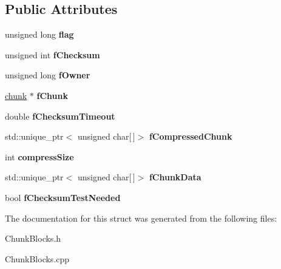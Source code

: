 \subsection*{\-Public \-Attributes}
\begin{DoxyCompactItemize}
\item 
\hypertarget{structChunkBlocks_ae1f57a236b339a0615ae340a3444659c}{unsigned long {\bfseries flag}}\label{structChunkBlocks_ae1f57a236b339a0615ae340a3444659c}

\item 
\hypertarget{structChunkBlocks_a24f6ef161d980e4451674aa1077b00ca}{unsigned int {\bfseries f\-Checksum}}\label{structChunkBlocks_a24f6ef161d980e4451674aa1077b00ca}

\item 
\hypertarget{structChunkBlocks_a7eb91bd11b29bc7a293ebb34a19b8023}{unsigned long {\bfseries f\-Owner}}\label{structChunkBlocks_a7eb91bd11b29bc7a293ebb34a19b8023}

\item 
\hypertarget{structChunkBlocks_a8e97b341e859cda581caefcf15e03705}{\hyperlink{structchunk}{chunk} $\ast$ {\bfseries f\-Chunk}}\label{structChunkBlocks_a8e97b341e859cda581caefcf15e03705}

\item 
\hypertarget{structChunkBlocks_a29da89a4fba0f0fc56217a6d0944beac}{double {\bfseries f\-Checksum\-Timeout}}\label{structChunkBlocks_a29da89a4fba0f0fc56217a6d0944beac}

\item 
\hypertarget{structChunkBlocks_a16aa1c3dbb8143c7654051ce40bddcdd}{std\-::unique\-\_\-ptr$<$ unsigned char\mbox{[}$\,$\mbox{]}$>$ {\bfseries f\-Compressed\-Chunk}}\label{structChunkBlocks_a16aa1c3dbb8143c7654051ce40bddcdd}

\item 
\hypertarget{structChunkBlocks_ab276a22dfcfe671bf9a0bfcb548fa5fb}{int {\bfseries compress\-Size}}\label{structChunkBlocks_ab276a22dfcfe671bf9a0bfcb548fa5fb}

\item 
\hypertarget{structChunkBlocks_a305279bad2806c9d75a78fa0ae762428}{std\-::unique\-\_\-ptr$<$ unsigned char\mbox{[}$\,$\mbox{]}$>$ {\bfseries f\-Chunk\-Data}}\label{structChunkBlocks_a305279bad2806c9d75a78fa0ae762428}

\item 
\hypertarget{structChunkBlocks_afa1dd96d29ae5f8e587efe93572497f1}{bool {\bfseries f\-Checksum\-Test\-Needed}}\label{structChunkBlocks_afa1dd96d29ae5f8e587efe93572497f1}

\end{DoxyCompactItemize}


\-The documentation for this struct was generated from the following files\-:\begin{DoxyCompactItemize}
\item 
\-Chunk\-Blocks.\-h\item 
\-Chunk\-Blocks.\-cpp\end{DoxyCompactItemize}
